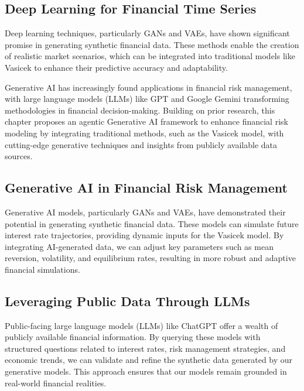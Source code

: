 \documentclass[a4paper,12pt]{scrbook}
\begin{document}
	\subsection{Deep Learning for Financial Time Series}
	
	Deep learning techniques, particularly GANs and VAEs, have shown significant promise in generating synthetic financial data. These methods enable the creation of realistic market scenarios, which can be integrated into traditional models like Vasicek to enhance their predictive accuracy and adaptability.
	
	
	Generative AI has increasingly found applications in financial risk management, with large language models (LLMs) like GPT and Google Gemini transforming methodologies in financial decision-making. Building on prior research, this chapter proposes an agentic Generative AI framework to enhance financial risk modeling by integrating traditional methods, such as the Vasicek model, with cutting-edge generative techniques and insights from publicly available data sources.
	
	\subsection{Generative AI in Financial Risk Management}
	
	Generative AI models, particularly GANs and VAEs, have demonstrated their potential in generating synthetic financial data. These models can simulate future interest rate trajectories, providing dynamic inputs for the Vasicek model. By integrating AI-generated data, we can adjust key parameters such as mean reversion, volatility, and equilibrium rates, resulting in more robust and adaptive financial simulations.
	
	\subsection{Leveraging Public Data Through LLMs}
	
	Public-facing large language models (LLMs) like ChatGPT offer a wealth of publicly available financial information. By querying these models with structured questions related to interest rates, risk management strategies, and economic trends, we can validate and refine the synthetic data generated by our generative models. This approach ensures that our models remain grounded in real-world financial realities.
	
\end{document}
